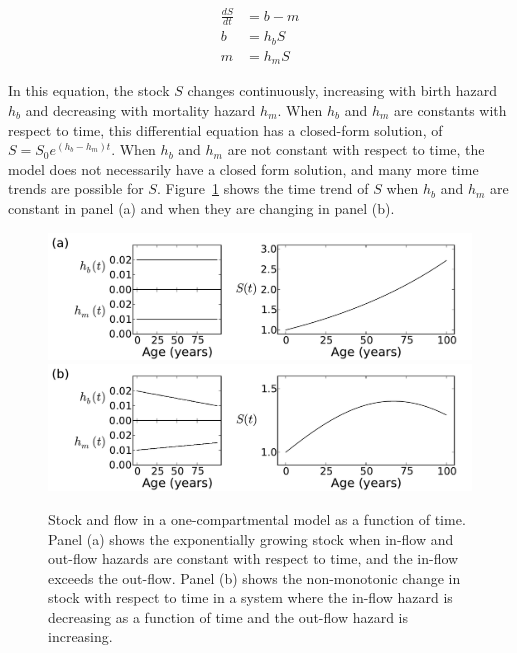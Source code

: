\begin{align*}
\frac{dS}{dt}&= b - m\\
b&=h_b S\\
m&=h_m S
\end{align*}

In this equation, the stock $S$ changes continuously, increasing with
birth hazard $h_b$ and decreasing with mortality hazard $h_m$. When $h_b$ and $h_m$
are constants with respect to time, this differential equation has a closed-form solution,
of $S = S_0 e^{(h_b-h_m)t}$. When $h_b$ and $h_m$ are not constant with
respect to time, the model does not necessarily have a closed form
solution, and many more time trends are possible for $S$.
Figure~\ref{forward-sim-one-compartment-soln} shows the time trend of
$S$ when $h_b$ and $h_m$ are constant in panel (a) and when they are
changing in panel (b).

\begin{figure}[h]
\begin{center}
\includegraphics[width=\textwidth]{one_compartment_constant_rate.pdf}
\includegraphics[width=\textwidth]{one_compartment_varying_rate.pdf}
\caption{Stock and flow in a one-compartmental model as a function of
  time. Panel (a) shows the exponentially growing stock when in-flow
  and out-flow hazards are constant with respect to time, and the in-flow
  exceeds the out-flow.  Panel (b) shows the non-monotonic change
  in stock with respect to time in a system where the in-flow hazard is
  decreasing as a function of time and the out-flow hazard is
  increasing.}
\label{forward-sim-one-compartment-soln}
\end{center}
\end{figure}


